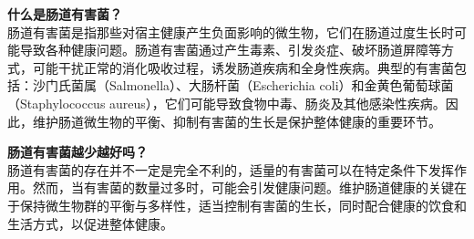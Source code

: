 \documentclass[UTF8]{ctexart}
\begin{document}
\begin{tcolorbox}[
    enhanced,
    colback=lightpurple!10, %
    colframe=lightpurple!10,  %
    arc=3mm,
    boxrule=0.5pt,
    width=\textwidth,
    top=8pt,
    bottom=8pt
]
{\small{\color{lightpurple}\faQuestionCircle}\quad \textbf{什么是肠道有害菌？}\\
{\color{orange!50}\faComments}\quad 肠道有害菌是指那些对宿主健康产生负面影响的微生物，它们在肠道过度生长时可能导致各种健康问题。肠道有害菌通过产生毒素、引发炎症、破坏肠道屏障等方式，可能干扰正常的消化吸收过程，诱发肠道疾病和全身性疾病。典型的有害菌包括：沙门氏菌属（Salmonella）、大肠杆菌（Escherichia coli）和金黄色葡萄球菌（Staphylococcus aureus），它们可能导致食物中毒、肠炎及其他感染性疾病。因此，维护肠道微生物的平衡、抑制有害菌的生长是保护整体健康的重要环节。
}
\end{tcolorbox}

\begin{tcolorbox}[
    enhanced,
    colback=lightpurple!10, %
    colframe=lightpurple!10,  %
    arc=3mm,
    boxrule=0.5pt,
    width=\textwidth,
    top=8pt,
    bottom=8pt
]
{\small{\color{lightpurple}\faQuestionCircle}\quad \textbf{肠道有害菌越少越好吗？}\\
{\color{orange!50}\faComments}\quad 肠道有害菌的存在并不一定是完全不利的，适量的有害菌可以在特定条件下发挥作用。然而，当有害菌的数量过多时，可能会引发健康问题。维护肠道健康的关键在于保持微生物群的平衡与多样性，适当控制有害菌的生长，同时配合健康的饮食和生活方式，以促进整体健康。
}
\end{tcolorbox}
\end{document}
